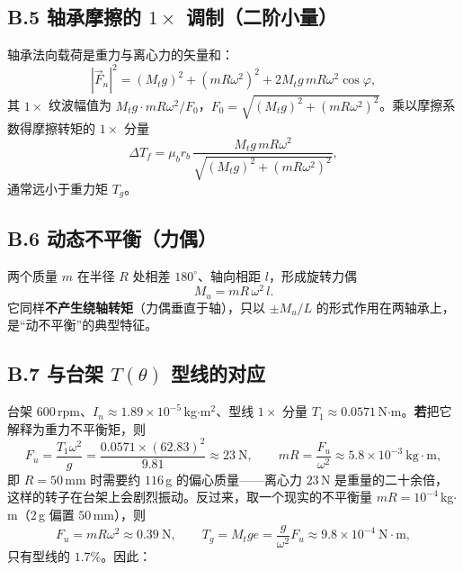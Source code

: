 \documentclass[11pt,a4paper]{article}
\theoremstyle{remark}\newtheorem{remark}{注}
\begin{document}
\subsection*{B.5 轴承摩擦的 $1\times$ 调制（二阶小量）}

轴承法向载荷是重力与离心力的矢量和：
\begin{equation}
|\vec F_n|^2=(M_t g)^2+(mR\omega^2)^2+2M_t g\,mR\omega^2\cos\varphi,
\end{equation}
其 $1\times$ 纹波幅值为 $M_tg\cdot mR\omega^2/F_0$，$F_0=\sqrt{(M_tg)^2+(mR\omega^2)^2}$。乘以摩擦系数得摩擦转矩的 $1\times$ 分量
\begin{equation}
\Delta T_f=\mu_b r_b\,\frac{M_t g\,mR\omega^2}{\sqrt{(M_tg)^2+(mR\omega^2)^2}},
\label{eq:unb-DTf}
\end{equation}
通常远小于重力矩 $T_g$。

\subsection*{B.6 动态不平衡（力偶）}

两个质量 $m$ 在半径 $R$ 处相差 $180^\circ$、轴向相距 $l$，形成旋转力偶
\begin{equation}
M_u=mR\,\omega^2\,l .
\label{eq:unb-Mu}
\end{equation}
它同样\textbf{不产生绕轴转矩}（力偶垂直于轴），只以 $\pm M_u/L$ 的形式作用在两轴承上，是“动不平衡”的典型特征。

\subsection*{B.7 与台架 $T(\theta)$ 型线的对应}

台架 $600$\,rpm、$I_n\approx1.89\times10^{-5}$\,kg$\cdot$m$^2$、型线 $1\times$ 分量 $T_1\approx0.0571$\,N$\cdot$m。\textbf{若}把它解释为重力不平衡矩，则
\begin{equation}
F_u=\frac{T_1\omega^2}{g}
=\frac{0.0571\times(62.83)^2}{9.81}\approx23\ \mathrm{N},
\qquad
mR=\frac{F_u}{\omega^2}\approx5.8\times10^{-3}\ \mathrm{kg\cdot m},
\end{equation}
即 $R=50$\,mm 时需要约 $116$\,g 的偏心质量——离心力 $23$\,N 是重量的二十余倍，这样的转子在台架上会剧烈振动。反过来，取一个现实的不平衡量 $mR=10^{-4}$\,kg$\cdot$m（$2$\,g 偏置 $50$\,mm），则
\begin{equation}
F_u=mR\omega^2\approx0.39\ \mathrm{N},\qquad
T_g=M_t g e=\frac{g}{\omega^2}F_u\approx9.8\times10^{-4}\ \mathrm{N\cdot m},
\end{equation}
只有型线的 $1.7\%$。因此：
\end{document}
